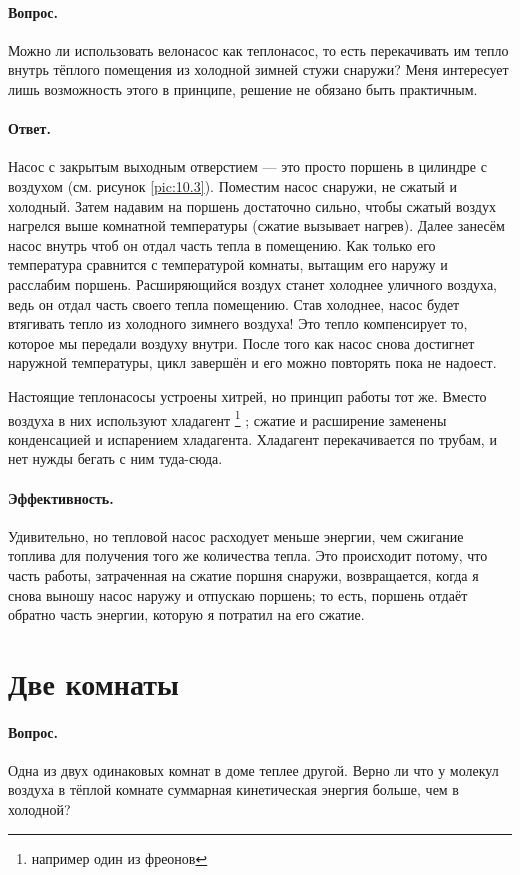 \paragraph{Вопрос.}
Можно ли использовать велонасос как теплонасос, то есть перекачивать им тепло внутрь тёплого помещения из холодной зимней стужи снаружи?
Меня интересует лишь возможность этого в принципе, решение не обязано быть практичным.

\paragraph{Ответ.}
Насос с закрытым выходным отверстием --- это просто поршень в цилиндре с воздухом (см. рисунок \ref{pic:10.3}).
Поместим насос снаружи, не сжатый и холодный.
Затем надавим на поршень достаточно сильно, чтобы сжатый воздух нагрелся выше комнатной температуры (сжатие вызывает нагрев).
Далее занесём насос внутрь чтоб он отдал часть тепла в помещению.
Как только его температура сравнится с температурой комнаты, вытащим его наружу и расслабим поршень.
Расширяющийся воздух станет холоднее уличного воздуха, ведь он отдал часть своего тепла помещению.
Став холоднее, насос будет втягивать тепло из холодного зимнего воздуха!
Это тепло компенсирует то, которое мы передали воздуху внутри.
После того как насос снова достигнет наружной температуры, цикл завершён и его можно повторять пока не надоест.

Настоящие теплонасосы устроены хитрей, но принцип работы тот же.
Вместо воздуха в них используют хладагент%
\footnote{например один из фреонов \pr}%
; сжатие и расширение заменены конденсацией и испарением хладагента.
Хладагент перекачивается по трубам, и нет нужды бегать с ним туда-сюда.

\paragraph{Эффективность.}
Удивительно, но тепловой насос расходует меньше энергии, чем сжигание топлива для получения того же количества тепла.
Это происходит потому, что часть работы, затраченная на сжатие поршня снаружи, возвращается, когда я снова выношу насос наружу и отпускаю поршень; то есть, поршень отдаёт обратно часть энергии, которую я потратил на его сжатие.

\section{Две комнаты}

\paragraph{Вопрос.}
Одна из двух одинаковых комнат в доме теплее другой.
Верно ли что у молекул воздуха в тёплой комнате
суммарная кинетическая энергия больше, чем в холодной?

